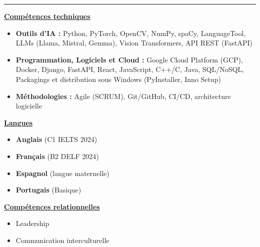 \documentclass[letterpaper,10pt]{article}
\begin{document}
  

\vspace{2pt}
\noindent\rule{\textwidth}{0.4pt}
\vspace{0pt}

\noindent
\begin{minipage}[t]{0.39\textwidth}
  \raggedright
  \textbf{\underline{Compétences techniques}}\\[-2pt]
  {\scriptsize
    \begin{itemize}[leftmargin=*,itemsep=1pt,parsep=0pt,topsep=0pt,partopsep=0pt]
      \item \textbf{Outils d'IA :} Python, PyTorch, OpenCV, NumPy, spaCy, LanguageTool, LLMs (Llama, Mistral, Gemma), Vision Transformers, API REST (FastAPI)
      \item \textbf{Programmation, Logiciels et Cloud :} Google Cloud Platform (GCP), Docker, Django, FastAPI, 
        React, JavaScript, C++/C, Java, SQL/NoSQL, Packagings et distribution sous Windows (PyInstaller, Inno Setup)
      \item \textbf{Méthodologies :} Agile (SCRUM), Git/GitHub, CI/CD, architecture logicielle
    \end{itemize}
  }
\end{minipage}\hfill
\begin{minipage}[t]{0.28\textwidth}
  \raggedright
  \textbf{\underline{Langues}}\\[-2pt]
  {\scriptsize
    \begin{itemize}[leftmargin=*,itemsep=0pt,parsep=0pt,topsep=0pt,partopsep=0pt]
      \item \textbf{Anglais} (C1 \textendash{} IELTS 2024)
      \item \textbf{Français} (B2 \textendash{} DELF 2024)
      \item \textbf{Espagnol} (langue maternelle)
      \item \textbf{Portugais} (Basique)
    \end{itemize}
  }

  \vspace{0.12cm}
  \textbf{\underline{Compétences relationnelles}}\\[-2pt]
  {\scriptsize
    \begin{itemize}[leftmargin=*,itemsep=1pt,parsep=0pt,topsep=0pt,partopsep=0pt]
      \item Leadership
      \item Communication interculturelle
    \end{itemize}
  }
\end{minipage}\hfill
\end{document}
